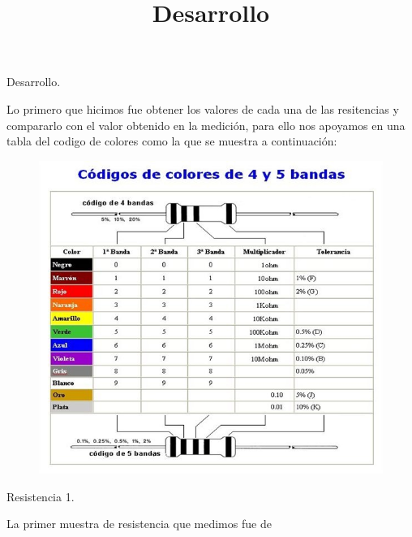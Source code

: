 \documentclass[12pt,a4paper]{report}
\title{Desarrollo}
\begin{document}
	\begin{center}
		\begin{Large}
			Desarrollo.\\
			\vspace{2.5cm}
		\end{Large}
	\end{center}
\begin{flushleft}
	Lo primero que hicimos fue obtener los valores de cada una de las resitencias y compararlo con el  valor obtenido en la medici\'on, para ello nos apoyamos en una tabla del codigo de colores como la que se muestra a continuaci\'on:\\
	\vspace{0.5cm}
\begin{figure}[H]
	\centering
	\includegraphics[width=0.4\linewidth]{bandas}
	\label{fig:bandas}
	\vspace{0.5cm}
\end{figure}
	
	\begin{large}
		Resistencia 1.
	\end{large}

	La primer muestra de resistencia que medimos fue de 




	
\end{flushleft}
	
\end{document}
